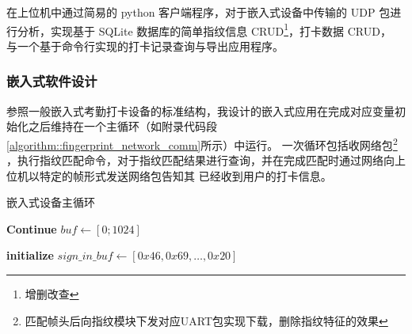     在上位机中通过简易的 python 客户端程序，对于嵌入式设备中传输的 UDP 包进行分析，实现基于 SQLite 数据库的简单指纹信息 CRUD\footnote{增删改查}，打卡数据 CRUD，
    与一个基于命令行实现的打卡记录查询与导出应用程序。

    \subsubsection{嵌入式软件设计}

    参照一般嵌入式考勤打卡设备的标准结构，我设计的嵌入式应用在完成对应变量初始化之后维持在一个主循环（如附录代码段\ref{algorithm::fingerprint_network_comm}所示）中运行。
    一次循环包括收网络包\footnote{匹配帧头后向指纹模块下发对应UART包实现下载，删除指纹特征的效果}
    ，执行指纹匹配命令，对于指纹匹配结果进行查询，并在完成匹配时通过网络向上位机以特定的帧形式发送网络包告知其
    已经收到用户的打卡信息。

    \begin{algorithm}[htb]
        \caption{嵌入式设备主循环}
        \label{algorithm::fingerprint_network_comm}
        \begin{algorithmic}[1]
         
             
                    \State {} 
                    \State \textbf{Continue} 
                \EndIf
                \State $buf \gets [0; 1024]$ 
            \EndIf
        
            \State {} 

            \State {} 
            \State {} 
            
            \State {} 
        
              
                \State {} 
                
                    \State \textbf{initialize} $sign\_in\_buf \gets [0x46, 0x69, \ldots, 0x20]$ 
                    \State {} 
                    \State {}
                    \State {} 
                \EndIf
                \State {}
            \EndIf
        \EndWhile
        \end{algorithmic}
        \end{algorithm}
        

